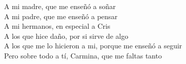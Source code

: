 

\renewcommand{\contentsname}{Índice General}
\renewcommand{\listtablename}{Lista de Tablas}
\renewcommand{\tablename}{Tabla}


\newpage
\thispagestyle{empty}
\begin{flushright}
    \phantom{blank}
    \vspace{25mm}

    A mi madre, que me enseñó a soñar \\
    A mi padre, que me enseñó a pensar  \\
    A mi hermanos, en especial a Cris  \\
    A los que hice daño, por si sirve de algo  \\
    A los que me lo hicieron a mi, porque me enseñó a seguir  \\
    Pero sobre todo a tí, Carmina, que me faltas tanto  \\
\end{flushright}
\newpage



\tableofcontents
\newpage
\cleardoublepage
\listoffigures %
\listoftables %

\lstlistoflistings

\newpage	